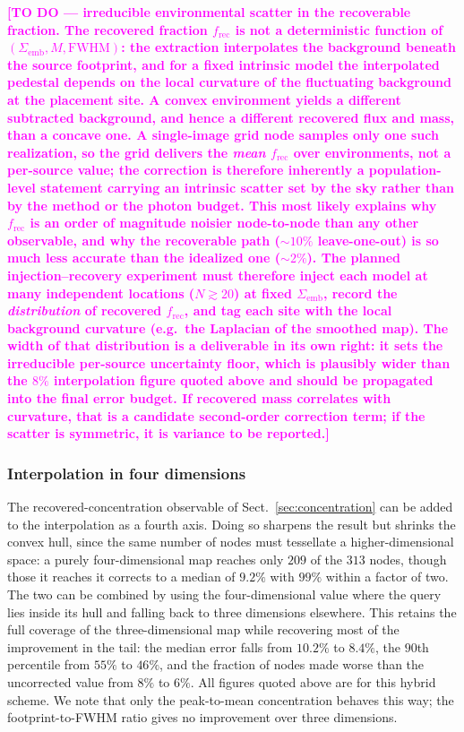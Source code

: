\documentclass[11pt,a4paper]{article}
\newcommand{\note}[1]{\textcolor{magenta}{\textbf{[#1]}}}
\begin{document}
\note{TO DO --- irreducible environmental scatter in the recoverable fraction.
The recovered fraction $f_{\mathrm{rec}}$ is not a deterministic function of
$(\Sigma_{\mathrm{emb}}, M, \mathrm{FWHM})$: the extraction interpolates the
background beneath the source footprint, and for a fixed intrinsic model the
interpolated pedestal depends on the local curvature of the fluctuating
background at the placement site. A convex environment yields a different
subtracted background, and hence a different recovered flux and mass, than a
concave one. A single-image grid node samples only one such realization, so
the grid delivers the \emph{mean} $f_{\mathrm{rec}}$ over environments, not a
per-source value; the correction is therefore inherently a population-level
statement carrying an intrinsic scatter set by the sky rather than by the
method or the photon budget. This most likely explains why $f_{\mathrm{rec}}$
is an order of magnitude noisier node-to-node than any other observable, and
why the recoverable path ($\sim$$10\%$ leave-one-out) is so much less accurate
than the idealized one ($\sim$$2\%$). The planned injection--recovery
experiment must therefore inject each model at many independent locations
($N\gtrsim20$) at fixed $\Sigma_{\mathrm{emb}}$, record the \emph{distribution}
of recovered $f_{\mathrm{rec}}$, and tag each site with the local background
curvature (e.g.\ the Laplacian of the smoothed map). The width of that
distribution is a deliverable in its own right: it sets the irreducible
per-source uncertainty floor, which is plausibly wider than the $8\%$
interpolation figure quoted above and should be propagated into the final
error budget. If recovered mass correlates with curvature, that is a candidate
second-order correction term; if the scatter is symmetric, it is variance to
be reported.}

\subsubsection*{Interpolation in four dimensions}

The recovered-concentration observable of Sect.~\ref{sec:concentration} can be added to
the interpolation as a fourth axis. Doing so sharpens the result but shrinks
the convex hull, since the same number of nodes must tessellate a
higher-dimensional space: a purely four-dimensional map reaches only $209$ of
the $313$ nodes, though those it reaches it corrects to a median of $9.2\%$
with $99\%$ within a factor of two. The two can be combined by using the
four-dimensional value where the query lies inside its hull and falling back to
three dimensions elsewhere. This retains the full coverage of the
three-dimensional map while recovering most of the improvement in the tail:
the median error falls from $10.2\%$ to $8.4\%$, the $90$th percentile from
$55\%$ to $46\%$, and the fraction of nodes made worse than the uncorrected
value from $8\%$ to $6\%$. All figures quoted above are for this hybrid
scheme. We note that only the peak-to-mean concentration behaves this way; the
footprint-to-FWHM ratio gives no improvement over three dimensions.
\end{document}
